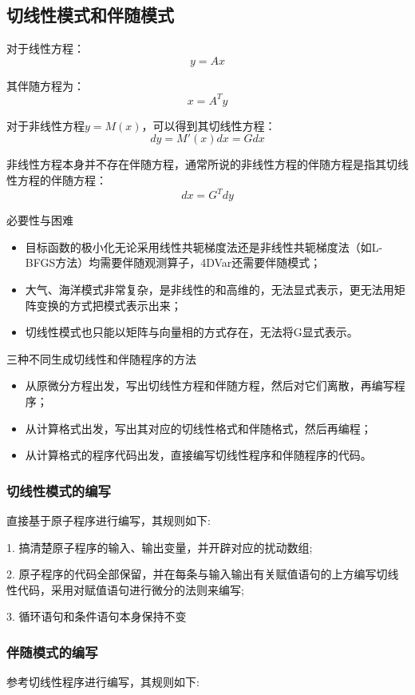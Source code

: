 \documentclass{article}
\begin{document}
\subsection{切线性模式和伴随模式}
对于线性方程：
$$y = Ax$$

其伴随方程为：
$$x = A^{T}y$$

对于非线性方程$y=M(x)$，可以得到其切线性方程：
$$dy = M'(x)dx = Gdx$$

非线性方程本身并不存在伴随方程，通常所说的非线性方程的伴随方程是指其切线性方程的伴随方程：
$$dx = G^Tdy$$

必要性与困难
\begin{itemize}
    \item 目标函数的极小化无论采用线性共轭梯度法还是非线性共轭梯度法（如L-BFGS方法）均需要伴随观测算子，4DVar还需要伴随模式；
    \item 大气、海洋模式非常复杂，是非线性的和高维的，无法显式表示，更无法用矩阵变换的方式把模式表示出来；
    \item 切线性模式也只能以矩阵与向量相的方式存在，无法将G显式表示。
\end{itemize}

三种不同生成切线性和伴随程序的方法
\begin{itemize}
    \item 从原微分方程出发，写出切线性方程和伴随方程，然后对它们离散，再编写程序；
    \item 从计算格式出发，写出其对应的切线性格式和伴随格式，然后再编程；
    \item 从计算格式的程序代码出发，直接编写切线性程序和伴随程序的代码。
\end{itemize}

\subsubsection{切线性模式的编写}

直接基于原子程序进行编写，其规则如下:

1. 搞清楚原子程序的输入、输出变量，并开辟对应的扰动数组;

2. 原子程序的代码全部保留，并在每条与输入输出有关赋值语句的上方编写切线性代码，采用对赋值语句进行微分的法则来编写;

3. 循环语句和条件语句本身保持不变

\subsubsection{伴随模式的编写}
参考切线性程序进行编写，其规则如下:
\end{document}
